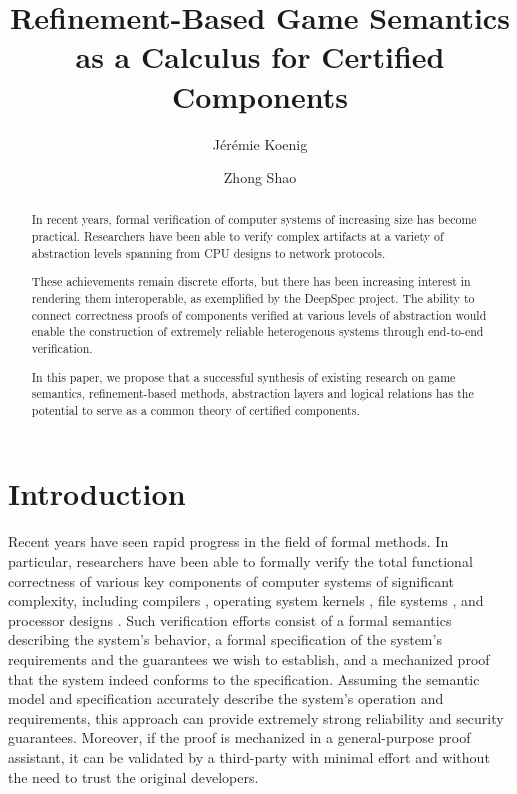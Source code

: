 \documentclass[acmsmall,timestamp,review]{acmart}
\title{Refinement-Based Game Semantics as
  a Calculus for Certified Components}
\author{J\'er\'emie Koenig}
\affiliation{Yale University}
\author{Zhong Shao}
\affiliation{Yale University}
\begin{document}
\begin{abstract} %
In recent years,
formal verification of computer systems
of increasing size has become practical.
Researchers have been able to verify complex artifacts
at a variety of abstraction levels spanning
from CPU designs to network protocols.

These achievements remain discrete efforts, but
there has been increasing interest in rendering them interoperable,
as exemplified by the DeepSpec project.
The ability to connect correctness proofs of components
verified at various levels of abstraction
would enable the construction of extremely reliable heterogenous systems
through end-to-end verification.

In this paper,
we propose that a successful synthesis of existing research on
game semantics,
refinement-based methods,
abstraction layers and
logical relations
has the potential to serve as a common theory
of certified components.
\end{abstract}

\maketitle

\section{Introduction} %


Recent years have seen rapid progress in the field of formal methods.
In particular,
researchers have been able to formally verify the
total functional correctness
of various key components of computer systems
of significant complexity,
including
compilers \cite{compcert, vellvm},
operating system kernels \cite{sel4, popl15},
file systems \cite{fscq}, and
processor designs \cite{safe}.
Such verification efforts
consist of
a formal semantics describing the system's behavior,
a formal specification of the system's requirements and
the guarantees we wish to establish,
and a mechanized proof that
the system indeed conforms to the specification.
Assuming the semantic model and specification accurately describe
the system's operation and requirements,
this approach can provide
extremely strong reliability and security guarantees.
Moreover,
if the proof is mechanized in a general-purpose proof assistant,
it can be validated by a third-party with minimal effort
and without the need to trust the original developers.
\end{document}
